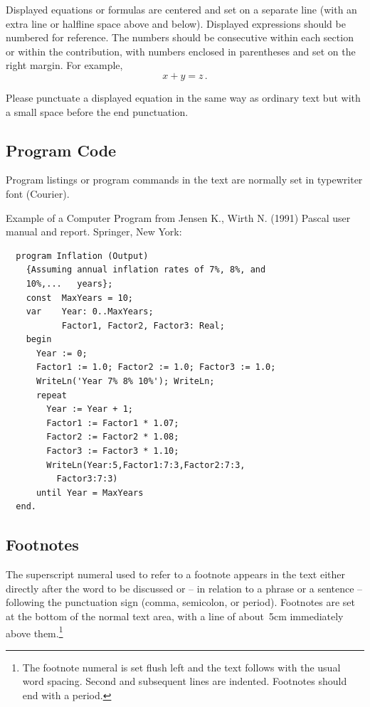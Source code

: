 \documentclass[runningheads]{AIIT}
\begin{document}
Displayed equations or formulas are centered and set on a separate line (with
an extra line or halfline space above and below). Displayed expressions should
be numbered for reference. The numbers should be consecutive within each
section or within the contribution, with numbers enclosed in parentheses and
set on the right margin. For example,
\begin{equation}
x + y = z\,.
\end{equation}

Please punctuate a displayed equation in the same way as ordinary text but
with a small space before the end punctuation.

\subsection{Program Code}

Program listings or program commands in the text are normally set in
typewriter font (Courier).

Example of a Computer Program from Jensen K., Wirth N. (1991) Pascal user
manual and report. Springer, New York:

\begin{verbatim}
  program Inflation (Output)
    {Assuming annual inflation rates of 7%, 8%, and
    10%,...   years};
    const  MaxYears = 10;
    var    Year: 0..MaxYears;
           Factor1, Factor2, Factor3: Real;
    begin
      Year := 0;
      Factor1 := 1.0; Factor2 := 1.0; Factor3 := 1.0;
      WriteLn('Year 7% 8% 10%'); WriteLn;
      repeat
        Year := Year + 1;
        Factor1 := Factor1 * 1.07;
        Factor2 := Factor2 * 1.08;
        Factor3 := Factor3 * 1.10;
        WriteLn(Year:5,Factor1:7:3,Factor2:7:3,
          Factor3:7:3)
      until Year = MaxYears
  end.
\end{verbatim}

\subsection{Footnotes}

The superscript numeral used to refer to a footnote appears in the text either
directly after the word to be discussed or -- in relation to a phrase or a
sentence -- following the punctuation sign (comma, semicolon, or period).
Footnotes are set at the bottom of the normal text area, with a line of
about~5cm immediately above them.\footnote{The footnote numeral is set flush
left and the text follows with the usual word spacing. Second and subsequent
lines are indented. Footnotes should end with a period.}
\end{document}
